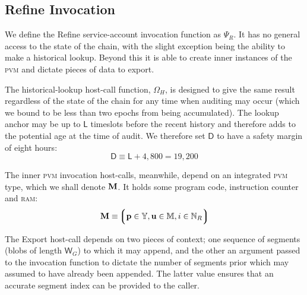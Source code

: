 \subsection{Refine Invocation}\label{sec:refineinvocation}

We define the Refine service-account invocation function as $\Psi_R$. It has no general access to the state of the \Jam chain, with the slight exception being the ability to make a historical lookup. Beyond this it is able to create inner instances of the \textsc{pvm} and dictate pieces of data to export.

The historical-lookup host-call function, $\Omega_H$, is designed to give the same result regardless of the state of the chain for any time when auditing may occur (which we bound to be less than two epochs from being accumulated). The lookup anchor may be up to $\mathsf{L}$ timeslots before the recent history and therefore adds to the potential age at the time of audit. We therefore set $\mathsf{D}$ to have a safety margin of eight hours:
\begin{equation}
  \mathsf{D} \equiv \mathsf{L} + 4,800 = 19,200
\end{equation}


The inner \textsc{pvm} invocation host-calls, meanwhile, depend on an integrated \textsc{pvm} type, which we shall denote $\mathbf{M}$. It holds some program code, instruction counter and \textsc{ram}:
\begin{equation}
  \pvm \equiv \tuple{\isa{\mathbf{p}}{\Y}, \isa{\mathbf{u}}{\ram}, \isa{i}{\N_R}}
\end{equation}

The Export host-call depends on two pieces of context; one sequence of segments (blobs of length $\mathsf{W}_G$) to which it may append, and the other an argument passed to the invocation function to dictate the number of segments prior which may assumed to have already been appended. The latter value ensures that an accurate segment index can be provided to the caller.

